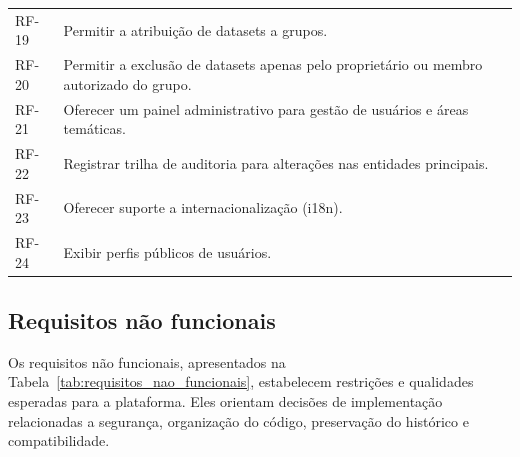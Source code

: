 \begin{longtable}{p{}p{}}
RF-19 & Permitir a atribuição de datasets a grupos. \\
RF-20 & Permitir a exclusão de datasets apenas pelo proprietário ou membro autorizado do grupo. \\
RF-21 & Oferecer um painel administrativo para gestão de usuários e áreas temáticas. \\
RF-22 & Registrar trilha de auditoria para alterações nas entidades principais. \\
RF-23 & Oferecer suporte a internacionalização (i18n). \\
RF-24 & Exibir perfis públicos de usuários. \\
\bottomrule
\end{longtable}

\subsection{Requisitos não funcionais}

Os requisitos não funcionais, apresentados na Tabela~\ref{tab:requisitos_nao_funcionais}, estabelecem restrições e qualidades esperadas para a plataforma. Eles orientam decisões de implementação relacionadas a segurança, organização do código, preservação do histórico e compatibilidade.

